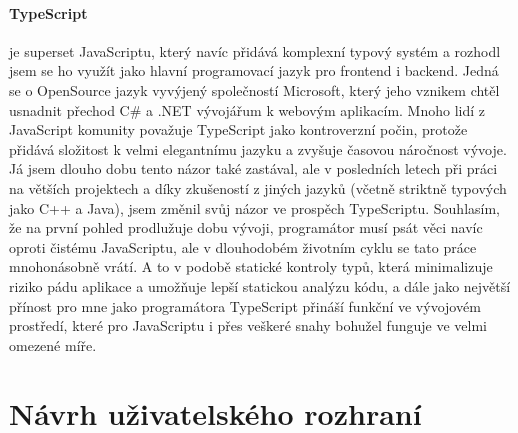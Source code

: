 \paragraph{TypeScript} je superset JavaScriptu, který navíc přidává komplexní typový systém a rozhodl jsem se ho využít jako hlavní programovací jazyk pro frontend i backend. Jedná se o OpenSource jazyk vyvýjený společností Microsoft, který jeho vznikem chtěl usnadnit přechod C\# a .NET vývojářum k webovým aplikacím. Mnoho lidí z JavaScript komunity považuje TypeScript jako kontroverzní počin, protože přidává složitost k velmi elegantnímu jazyku a zvyšuje časovou náročnost vývoje. Já jsem dlouho dobu tento názor také zastával, ale v posledních letech při práci na větších projektech a díky zkušeností z jiných jazyků (včetně striktně typových jako C++ a Java), jsem změnil svůj názor ve prospěch TypeScriptu. Souhlasím, že na první pohled prodlužuje dobu vývoji, programátor musí psát věci navíc oproti čistému JavaScriptu, ale v dlouhodobém životním cyklu se tato práce  mnohonásobně vrátí. A to v podobě statické kontroly typů, která minimalizuje riziko pádu aplikace a umožňuje  lepší statickou analýzu kódu, a dále jako největší přínost pro mne jako programátora TypeScript přináší funkční  ve vývojovém prostředí, které pro JavaScriptu i přes veškeré snahy bohužel funguje ve velmi omezené míře.

\section{Návrh uživatelského rozhraní}